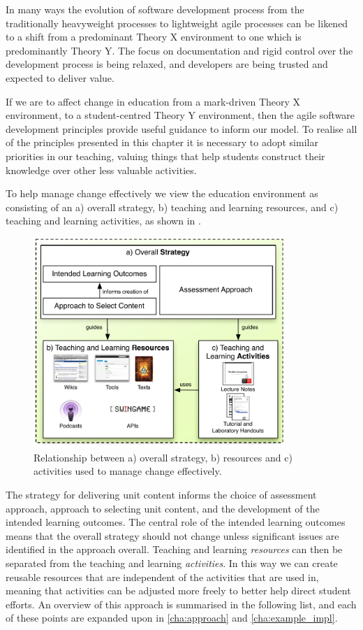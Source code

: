 In many ways the evolution of software development process from the traditionally heavyweight processes to lightweight agile processes can be likened to a shift from a predominant Theory X environment to one which is predominantly Theory Y. The focus on documentation and rigid control over the development process is being relaxed, and developers are being trusted and expected to deliver value. 

If we are to affect change in education from a mark-driven Theory X environment, to a student-centred Theory Y environment, then the agile software development principles provide useful guidance to inform our model. To realise all of the principles presented in this chapter it is necessary to adopt similar priorities in our teaching, valuing things that help students construct their knowledge over other less valuable activities.

To help manage change effectively we view the education environment as consisting of an a) overall strategy, b) teaching and learning resources, and c) teaching and learning activities, as shown in . 

\begin{figure}[htbp]
	\centering
	\includegraphics[width=0.85\textwidth]{StrategyResourcesActivities}
	\caption{Relationship between a) overall strategy, b) resources and c) activities used to manage change effectively.}
	\label{fig:strategy}
\end{figure}

The strategy for delivering unit content informs the choice of assessment approach, approach to selecting unit content, and the development of the intended learning outcomes. The central role of the intended learning outcomes means that the overall strategy should not change unless significant issues are identified in the approach overall. Teaching and learning \emph{resources} can then be separated from the teaching and learning \emph{activities}. In this way we can create reusable resources that are independent of the activities that are used in, meaning that activities can be adjusted more freely to better help direct student efforts. An overview of this approach is summarised in the following list, and each of these points are expanded upon in \cref{cha:approach} and \cref{cha:example_impl}.

